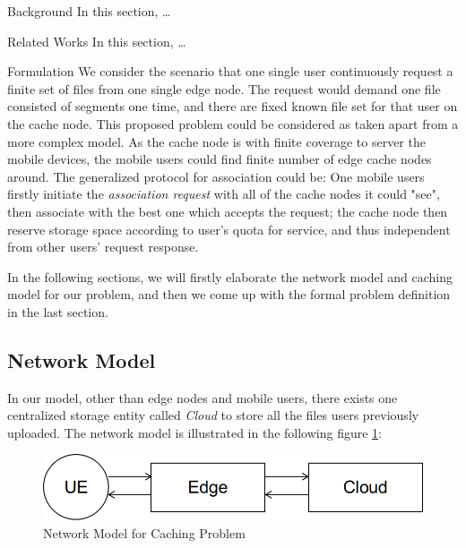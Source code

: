 \documentclass{article}
\begin{document}
\begin{section}{Background}
    \label{background}
    In this section, \dots
\end{section}

\begin{section}{Related Works}
    \label{review}
    In this section, \dots
\end{section}

\begin{section}{Formulation}
    \label{formulation}
    We consider the scenario that one single user continuously request a finite set of files from one single edge node. The request would demand one file consisted of segments one time, and there are fixed known file set for that user on the cache node.
    This proposed problem could be considered as taken apart from a more complex model. As the cache node is with finite coverage to server the mobile devices, the mobile users could find finite number of edge cache nodes around. The generalized protocol for association could be: One mobile users firstly initiate the \textit{association request} with all of the cache nodes it could "see", then associate with the best one which accepts the request; the cache node then reserve storage space according to user's quota for service, and thus independent from other users' request response.
    
    In the following sections, we will firstly elaborate the network model and caching model for our problem, and then we come up with the formal problem definition in the last section.

    \subsection{Network Model}
    \label{net_model}
    In our model, other than edge nodes and mobile users, there exists one centralized storage entity called \emph{Cloud} to store all the files users previously uploaded.
    The network model is illustrated in the following figure \ref{fig:network}:

    \begin{figure}[h!]
        \label{fig:network}
        \centering
        \includegraphics[width=0.8\linewidth]{images/network.png}
        \caption{Network Model for Caching Problem}
    \end{figure}


\end{section}
\end{document}
